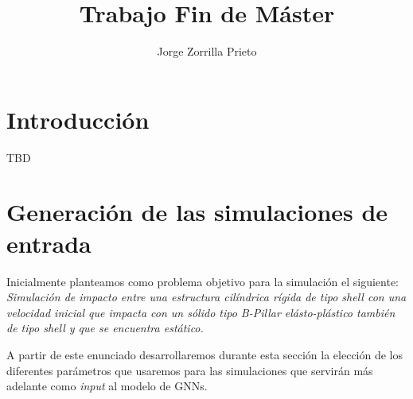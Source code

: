 \documentclass[11pt]{article} %
\begin{document}
\title{Trabajo Fin de Máster}
\author{Jorge Zorrilla Prieto}



\maketitle



\section{Introducción}
TBD

\section{Generación de las simulaciones de entrada}
Inicialmente planteamos como problema objetivo para la simulación el siguiente:
\newline
\newline
\textit{Simulación de impacto entre una estructura cilíndrica rígida de tipo shell con una velocidad inicial que impacta con un sólido tipo B-Pillar elásto-plástico también de tipo shell y que
se encuentra estático.}
\newline
\newline

A partir de este enunciado desarrollaremos durante esta sección la elección de los diferentes parámetros que usaremos para las simulaciones que servirán más adelante como \textit{input} al
modelo de GNNs.
\end{document}

